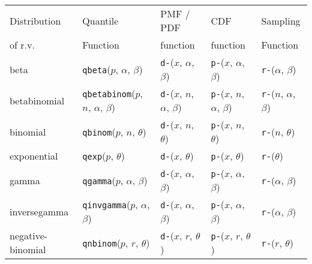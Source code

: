 \begin{table}[htp]
    \centering
    \small
    \begin{tabular}{l | llll}
    Distribution                  & Quantile  & PMF / PDF  &CDF       & Sampling  \\ 
    of r.v. &  Function & function         & function &  Function \\ \hline
    beta & \texttt{qbeta}($p$, $\alpha$, $\beta$)             
    & \texttt{d-}($x$, $\alpha$, $\beta$)
    & \texttt{p-}($x$, $\alpha$, $\beta$) 
    & \texttt{r-}($\alpha$, $\beta$) \\
    betabinomial & \texttt{qbetabinom}($p$, $n$, $\alpha$, $\beta$)              
    & \texttt{d-}($x$, $n$, $\alpha$, $\beta$)
    & \texttt{p-}($x$, $n$, $\alpha$, $\beta$) 
    & \texttt{r-}($n$, $\alpha$, $\beta$) \\
    
    
    binomial & \texttt{qbinom}($p$, $n$, $\theta$) 
    & \texttt{d-}($x$, $n$, $\theta$)
    & \texttt{p-}($x$, $n$, $\theta$) 
    & \texttt{r-}($n$, $\theta$) \\
    
    exponential & \texttt{qexp}($p$, $\theta$) 
    & \texttt{d-}($x$, $\theta$) 
    & \texttt{p-}($x$, $\theta$) 
    & \texttt{r-}($\theta$) \\
    
    gamma & \texttt{qgamma}($p$, $\alpha$, $\beta$) 
    & \texttt{d-}($x$, $\alpha$, $\beta$)
    & \texttt{p-}($x$, $\alpha$, $\beta$) 
    & \texttt{r-}($\alpha$, $\beta$) \\
    
    
    inversegamma & \texttt{qinvgamma}($p$, $\alpha$, $\beta$) 
    & \texttt{d-}($x$, $\alpha$, $\beta$)
    & \texttt{p-}($x$, $\alpha$, $\beta$) 
    & \texttt{r-}($\alpha$, $\beta$) \\
    
    negative-binomial & \texttt{qnbinom}($p$, $r$, $\theta$) 
    & \texttt{d-}($x$, $r$, $\theta$) 
    & \texttt{p-}($x$, $r$, $\theta$) 
    & \texttt{r-}($r$, $\theta$) \\
    

\end{tabular}
\end{table}
